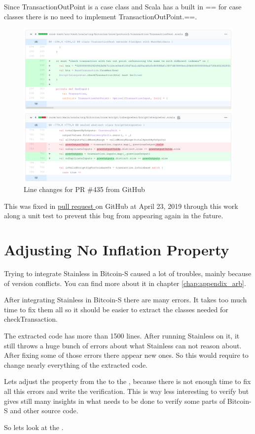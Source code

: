 Since TransactionOutPoint is a case class and Scala has a built in == for case classes there is no need to implement TransactionOutPoint.==.
\begin{figure}[H]
	\centering
		\includegraphics[scale=0.396]{images/bitcoin-s-pr.png}
	\caption{Line changes for PR \#435 from GitHub}
	\label{fig:output1}
\end{figure}

This was fixed in \href{https://github.com/bitcoin-s/bitcoin-s/pull/435}{pull request } on GitHub at April 23, 2019 through this work along a unit test to prevent this bug from appearing again in the future.


\section{Adjusting No Inflation Property}

Trying to integrate Stainless in Bitcoin-S caused a lot of troubles, mainly because of version conflicts.
You can find more about it in chapter \ref{chap:appendix_arb}.

After integrating Stainless in Bitcoin-S there are many errors.
It takes too much time to fix them all so it should be easier to extract the classes needed for checkTransaction.

The extracted code has more than 1500 lines.
After running Stainless on it, it still throws a huge bunch of errors about what Stainless can not reason about.
After fixing some of those errors there appear new ones.
So this would require to change nearly everything of the extracted code.

Lets adjust the property from the  to the , because there is not enough time to fix all this errors and write the verification.
This is way less interesting to verify but gives still many insights in what needs to be done to verify some parts of Bitcoin-S and other source code.

So lets look at the .
